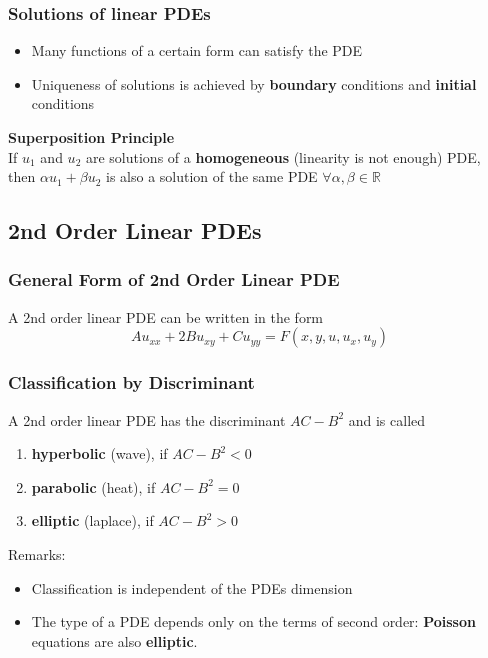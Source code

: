 \subsubsection{Solutions of linear PDEs}
\begin{itemize}
    \item Many functions of a certain form can satisfy the PDE
    \item Uniqueness of solutions is achieved by \textbf{boundary} conditions and \textbf{initial} conditions
\end{itemize}
\vspace{5pt}
\textbf{Superposition Principle}\\
If $u_{1}$ and $u_{2}$ are solutions of a \textbf{homogeneous} (linearity is not enough) PDE, then $\alpha u_{1} + \beta u_{2}$ is also a solution of the same PDE $\forall \alpha , \beta \in \mathbb{R}$

\subsection{2nd Order Linear PDEs}
\subsubsection{General Form of 2nd Order Linear PDE}
A 2nd order linear PDE can be written in the form
\begin{equation*}
    Au_{xx}+2Bu_{xy}+Cu_{yy}=F(x,y,u,u_x,u_y)
\end{equation*}

\subsubsection{Classification by Discriminant}
A 2nd order linear PDE has the discriminant $AC-B^2$ and is called
\begin{enumerate}
    \item \textbf{hyperbolic} (wave), if $AC-B^2<0$
    \item \textbf{parabolic} (heat), if $AC-B^2=0$
    \item \textbf{elliptic} (laplace), if $AC-B^2>0$
\end{enumerate}
\vspace{5pt}
Remarks:
\begin{itemize}
    \item Classification is independent of the PDEs dimension\vspace{5pt}
    \item The type of a PDE depends only on the terms of second order: \textbf{Poisson} equations are also \textbf{elliptic}.
\end{itemize}

